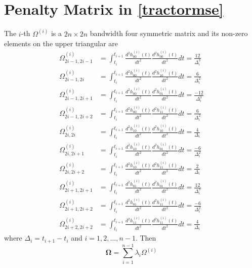 


\section{Penalty Matrix in \eqref{tractormse}}\label{PenaltyTermDetails}

The $i$-th $\Omega^{(i)}$ is a $2n \times 2n$ bandwidth four symmetric matrix and its non-zero elements on the upper triangular are 
\begin{align}
\Omega_{2i-1,2i-1}^{(i)} & =\int_{t_{i}}^{t_{i+1}} \frac{d^2 h_{00}^{(i)}(t)}{dt^2}  \frac{d^2 h_{00}^{(i)}(t)}{dt^2} dt=\frac{12}{\Delta_i^3}\\
\Omega_{2i-1,2i}^{(i)} &=\int_{t_{i}}^{t_{i+1}} \frac{d^2 h_{00}^{(i)}(t)}{dt^2}  \frac{d^2 h_{10}^{(i)}(t)}{dt^2} dt=\frac{6}{\Delta_i^2}\\
\Omega_{2i-1,2i+1}^{(i)} &=\int_{t_{i}}^{t_{i+1}} \frac{d^2 h_{00}^{(i)}(t)}{dt^2}  \frac{d^2 h_{01}^{(i)}(t)}{dt^2} dt=\frac{-12}{\Delta_i^3}\\
\Omega_{2i-1,2i+2}^{(i)} &=\int_{t_{i}}^{t_{i+1}} \frac{d^2 h_{00}^{(i)}(t)}{dt^2}  \frac{d^2 h_{11}^{(i)}(t)}{dt^2} dt=\frac{6}{\Delta_i^2}\\
\Omega_{2i,2i}^{(i)} &=\int_{t_{i}}^{t_{i+1}} \frac{d^2 h_{10}^{(i)}(t)}{dt^2}  \frac{d^2 h_{10}^{(i)}(t)}{dt^2} dt=\frac{4}{\Delta_i} \\
\Omega_{2i,2i+1}^{(i)} &=\int_{t_{i}}^{t_{i+1}} \frac{d^2 h_{10}^{(i)}(t)}{dt^2}  \frac{d^2 h_{01}^{(i)}(t)}{dt^2} dt=\frac{-6}{\Delta_i^2}\\
\Omega_{2i,2i+2}^{(i)} &=\int_{t_{i}}^{t_{i+1}} \frac{d^2 h_{10}^{(i)}(t)}{dt^2}  \frac{d^2 h_{11}^{(i)}(t)}{dt^2} dt=\frac{2}{\Delta_i}\\
\Omega_{2i+1,2i+1}^{(i)} &=\int_{t_{i}}^{t_{i+1}} \frac{d^2 h_{01}^{(i)}(t)}{dt^2}  \frac{d^2 h_{01}^{(i)}(t)}{dt^2} dt=\frac{12}{\Delta_i^3}\\
\Omega_{2i+1,2i+2}^{(i)} &=\int_{t_{i}}^{t_{i+1}} \frac{d^2 h_{01}^{(i)}(t)}{dt^2}  \frac{d^2 h_{11}^{(i)}(t)}{dt^2} dt=\frac{-6}{\Delta_i^2}\\
\Omega_{2i+2,2i+2}^{(i)} &=\int_{t_{i}}^{t_{i+1}} \frac{d^2 h_{11}^{(i)}(t)}{dt^2}  \frac{d^2 h_{11}^{(i)}(t)}{dt^2} dt=\frac{4}{\Delta_i}
\end{align}
where $\Delta_i=t_{i+1}-t_i$ and $i=1,2,\ldots,n-1$. Then 
\begin{equation*}
\mathbf{\Omega}=\sum_{i=1}^{n-1}\lambda_i\Omega^{(i)}
\end{equation*}


